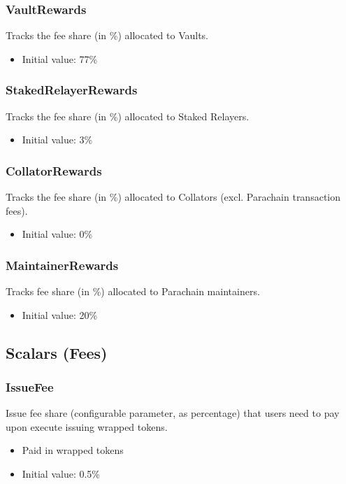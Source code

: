 \documentclass[a4paper,10pt,english]{sphinxmanual}
\begin{document}
\subsubsection{VaultRewards}
\label{\detokenize{spec/fee:vaultrewards}}
Tracks the fee share (in \%) allocated to Vaults.
\begin{itemize}
\item {} 
Initial value: 77\%

\end{itemize}


\subsubsection{StakedRelayerRewards}
\label{\detokenize{spec/fee:stakedrelayerrewards}}
Tracks the fee share (in \%) allocated to Staked Relayers.
\begin{itemize}
\item {} 
Initial value: 3\%

\end{itemize}


\subsubsection{CollatorRewards}
\label{\detokenize{spec/fee:collatorrewards}}
Tracks the fee share (in \%) allocated to Collators (excl. Parachain transaction fees).
\begin{itemize}
\item {} 
Initial value: 0\%

\end{itemize}


\subsubsection{MaintainerRewards}
\label{\detokenize{spec/fee:maintainerrewards}}
Tracks fee share (in \%) allocated to Parachain maintainers.
\begin{itemize}
\item {} 
Initial value: 20\%

\end{itemize}


\subsection{Scalars (Fees)}
\label{\detokenize{spec/fee:scalars-fees}}

\subsubsection{IssueFee}
\label{\detokenize{spec/fee:issuefee}}
Issue fee share (configurable parameter, as percentage) that users need to pay upon execute issuing wrapped tokens.
\begin{itemize}
\item {} 
Paid in wrapped tokens

\item {} 
Initial value: 0.5\%

\end{itemize}
\end{document}
